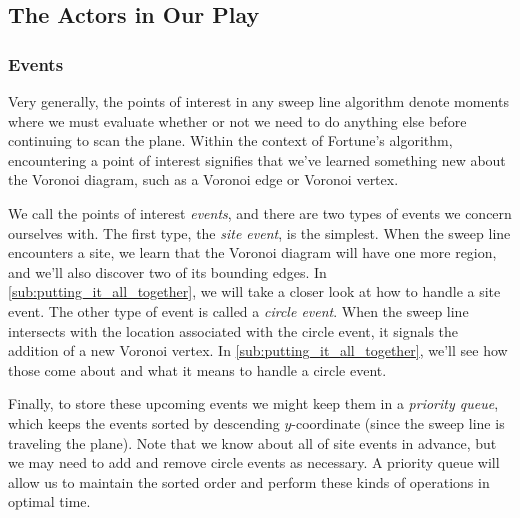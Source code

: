 \documentclass[12pt,twoside]{reedthesis}
\begin{document}
    \subsection{The Actors in Our Play} %
    \label{sub:the_actors_in_our_play}

      \subsubsection{Events} %
      \label{ssub:events}
        Very generally, the points of interest in any sweep line algorithm denote moments where we must evaluate whether or not we need to do anything else before continuing to scan the plane. Within the context of Fortune's algorithm, encountering a point of interest signifies that we've learned something new about the Voronoi diagram, such as a Voronoi edge or Voronoi vertex. \par

        We call the points of interest \emph{events}, and there are two types of events we concern ourselves with. The first type, the \emph{site event}, is the simplest. When the sweep line encounters a site, we learn that the Voronoi diagram will have one more region, and we'll also discover two of its bounding edges. In \cref{sub:putting_it_all_together}, we will take a closer look at how to handle a site event. The other type of event is called a \emph{circle event}. When the sweep line intersects with the location associated with the circle event, it signals the addition of a new Voronoi vertex. In \cref{sub:putting_it_all_together}, we'll see how those come about and what it means to handle a circle event.\par

        Finally, to store these upcoming events we might keep them in a \emph{priority queue}, which keeps the events sorted by descending $y$-coordinate (since the sweep line is traveling  the plane). Note that we know about all of site events in advance, but we may need to add and remove circle events as necessary. A priority queue will allow us to maintain the sorted order and perform these kinds of operations in optimal time. 


\end{document}
